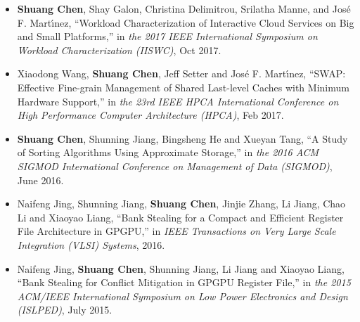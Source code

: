 \documentclass{res}
\begin{document}
\begin{resume}
\begin{itemize}[leftmargin=*]
\item {\bf Shuang Chen}, Shay Galon, Christina Delimitrou, Srilatha Manne, and Jos{\'e} F. Mart{\'\i}nez, ``Workload Characterization of Interactive Cloud Services on Big and Small Platforms,'' in {\em the 2017 IEEE International Symposium on Workload Characterization (IISWC)}, Oct 2017.

\item Xiaodong Wang, {\bf Shuang Chen}, Jeff Setter and Jos{\'e} F. Mart{\'\i}nez, ``SWAP: Effective Fine-grain Management of Shared Last-level Caches with Minimum Hardware Support,'' in {\em the 23rd IEEE HPCA International Conference on High Performance Computer Architecture (HPCA)}, Feb 2017.

\item  {\bf Shuang Chen}, Shunning Jiang, Bingsheng He and Xueyan Tang, ``A Study of Sorting Algorithms Using Approximate Storage,'' in {\em the 2016 ACM SIGMOD International Conference on Management of Data (SIGMOD)}, June 2016.

\item Naifeng Jing, Shunning Jiang, {\bf Shuang Chen}, Jinjie Zhang, Li Jiang, Chao Li and Xiaoyao Liang, ``Bank Stealing for a Compact and Efficient Register File Architecture in GPGPU,'' in {\em IEEE Transactions on Very Large Scale Integration (VLSI) Systems}, 2016.

\item Naifeng Jing, {\bf Shuang Chen}, Shunning Jiang, Li Jiang and Xiaoyao Liang, ``Bank Stealing for Conflict Mitigation in GPGPU Register File,'' in {\em the 2015 ACM/IEEE International Symposium on Low Power Electronics and Design (ISLPED)}, July 2015.

\end{itemize}


\end{resume}
\end{document}

